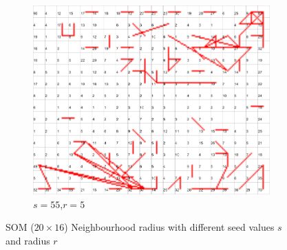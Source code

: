 \documentclass{acm_proc_article-sp}
\begin{document}
\begin{figure}
\begin{subfigure}[b]{0.30\linewidth}
        \label{fig:wine-newmid-radius-neighbourhood-graph--r-05-seed-7}
    \end{subfigure}
    \begin{subfigure}[b]{0.30\linewidth}
        \includegraphics[width=\linewidth]{img/wine-newmid-radius-neighbourhood-graph--r-05-seed-55}
        \caption{$s=55$,$r=5$}
        \label{fig:wine-newmid-radius-neighbourhood-graph--r-05-seed-55}
    \end{subfigure}
    \caption{SOM ($20\times16$) Neighbourhood radius with different seed values $s$ and radius $r$}
    \label{fig:wine-newmid-radius-neighbourhood-graph--r-05-seed}
\end{figure}
\end{document}
